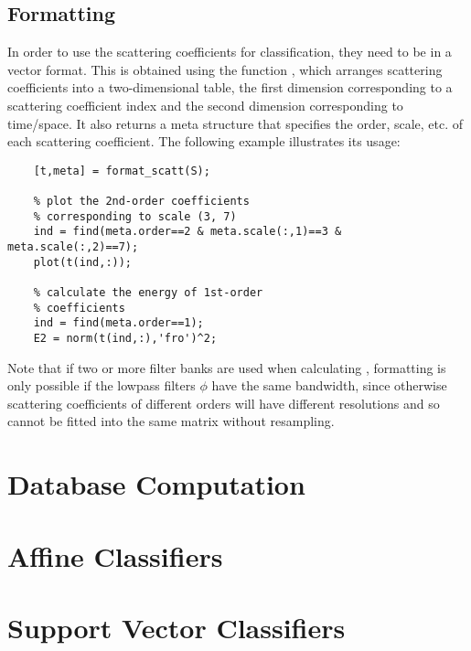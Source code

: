 \documentclass[twocolumn]{article}
\begin{document}
\subsection{Formatting}
In order to use the scattering coefficients for classification, they need to be in a vector format. This is obtained using the function , which arranges scattering coefficients into a two-dimensional table, the first dimension corresponding to a scattering coefficient index and the second dimension corresponding to time/space. It also returns a meta structure that specifies the order, scale, etc. of each scattering coefficient. The following example illustrates its usage:
\begin{lstlisting}
	[t,meta] = format_scatt(S);
	
	% plot the 2nd-order coefficients
	% corresponding to scale (3, 7)
	ind = find(meta.order==2 & meta.scale(:,1)==3 & meta.scale(:,2)==7);
	plot(t(ind,:));
	
	% calculate the energy of 1st-order
	% coefficients
	ind = find(meta.order==1);
	E2 = norm(t(ind,:),'fro')^2;
\end{lstlisting}

Note that if two or more filter banks are used when calculating , formatting is only possible if the lowpass filters $\phi$ have the same bandwidth, since otherwise scattering coefficients of different orders will have different resolutions and so cannot be fitted into the same matrix without resampling.

\section{Database Computation}

\section{Affine Classifiers}

\section{Support Vector Classifiers}
\end{document}
